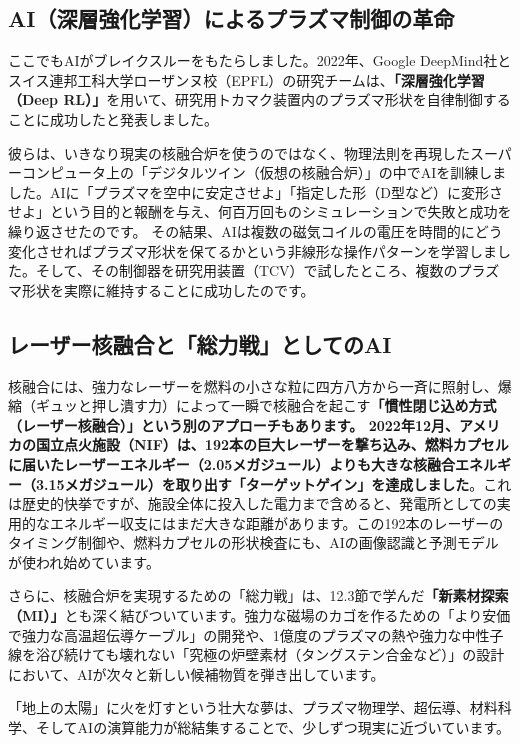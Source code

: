 \subsection{AI（深層強化学習）によるプラズマ制御の革命}

ここでもAIがブレイクスルーをもたらしました。2022年、Google DeepMind社とスイス連邦工科大学ローザンヌ校（EPFL）の研究チームは、\textbf{「深層強化学習（Deep RL）」}を用いて、研究用トカマク装置内のプラズマ形状を自律制御することに成功したと発表しました。

彼らは、いきなり現実の核融合炉を使うのではなく、物理法則を再現したスーパーコンピュータ上の「デジタルツイン（仮想の核融合炉）」の中でAIを訓練しました。AIに「プラズマを空中に安定させよ」「指定した形（D型など）に変形させよ」という目的と報酬を与え、何百万回ものシミュレーションで失敗と成功を繰り返させたのです。 その結果、AIは複数の磁気コイルの電圧を時間的にどう変化させればプラズマ形状を保てるかという非線形な操作パターンを学習しました。そして、その制御器を研究用装置（TCV）で試したところ、複数のプラズマ形状を実際に維持することに成功したのです。

\subsection{レーザー核融合と「総力戦」としてのAI}

核融合には、強力なレーザーを燃料の小さな粒に四方八方から一斉に照射し、爆縮（ギュッと押し潰す力）によって一瞬で核融合を起こす\textbf{「慣性閉じ込め方式（レーザー核融合）」という別のアプローチもあります。 2022年12月、アメリカの国立点火施設（NIF）は、192本の巨大レーザーを撃ち込み、燃料カプセルに届いたレーザーエネルギー（2.05メガジュール）よりも大きな核融合エネルギー（3.15メガジュール）を取り出す「ターゲットゲイン」を達成しました}。これは歴史的快挙ですが、施設全体に投入した電力まで含めると、発電所としての実用的なエネルギー収支にはまだ大きな距離があります。この192本のレーザーのタイミング制御や、燃料カプセルの形状検査にも、AIの画像認識と予測モデルが使われ始めています。

さらに、核融合炉を実現するための「総力戦」は、12.3節で学んだ\textbf{「新素材探索（MI）」}とも深く結びついています。強力な磁場のカゴを作るための「より安価で強力な高温超伝導ケーブル」の開発や、1億度のプラズマの熱や強力な中性子線を浴び続けても壊れない「究極の炉壁素材（タングステン合金など）」の設計において、AIが次々と新しい候補物質を弾き出しています。

「地上の太陽」に火を灯すという壮大な夢は、プラズマ物理学、超伝導、材料科学、そしてAIの演算能力が総結集することで、少しずつ現実に近づいています。

